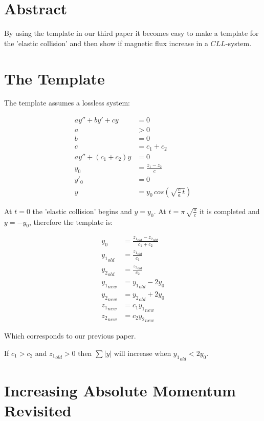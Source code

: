 
\section{Abstract}

By using the template in our third paper\cite{analogies} it becomes easy to make a template for the 'elastic collision' and then show if magnetic flux increase in a $CLL$-system.

\section{The Template}

The template assumes a lossless system:

\begin{align}
a y'' + b y' + c y &= 0 \\
a &> 0 \\
b &= 0 \\
c &= c_1 + c_2 \\
a y'' + (c_1 + c_2) y &= 0 \\
y_0 &= \frac{z_1-z_2}{c} \\
y'_0 &= 0 \\
y &= y_0 \, cos(\sqrt{\frac{c}{a} \, t})
\end{align}

At $t=0$ the 'elastic collision' begins and $y=y_0$.
At $t = \pi \, \sqrt{\frac{a}{c}}$ it is completed and $y = -y_0$, therefore the template is:

\begin{align}
y_0 &= \frac{{z_1}_{old}-{z_2}_{old}}{c_1 + c_2} \\
{y_1}_{old} &= \frac{{z_1}_{old}}{c_1} \\
{y_2}_{old} &= \frac{{z_2}_{old}}{c_2} \\
{y_1}_{new} &= {y_1}_{old} -2 y_0 \\
{y_2}_{new} &= {y_2}_{old} +2 y_0 \\
{z_1}_{new} &= c_1 {y_1}_{new} \\
{z_2}_{new} &= c_2 {y_2}_{new}
\end{align}

Which corresponds to our previous paper\cite{masspar}.

If $c_1 > c_2$ and ${z_1}_{old} > 0$ then $\sum |y|$ will increase when ${y_1}_{old} < 2 y_0$.

\section{Increasing Absolute Momentum Revisited}

